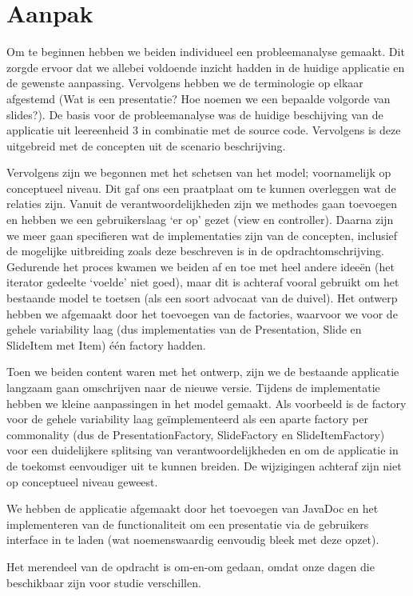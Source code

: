\documentclass[a4paper]{article}
\begin{document}
\section*{Aanpak}
Om te beginnen hebben we beiden individueel een probleemanalyse gemaakt. Dit zorgde ervoor dat we allebei voldoende inzicht hadden in de huidige applicatie en de gewenste aanpassing. Vervolgens hebben we de terminologie op elkaar afgestemd (Wat is een presentatie? Hoe noemen we een bepaalde volgorde van slides?). De basis voor de probleemanalyse was de huidige beschijving van de applicatie uit leereenheid 3 in combinatie met de source code. Vervolgens is deze uitgebreid met de concepten uit de scenario beschrijving.
\par
Vervolgens zijn we begonnen met het schetsen van het model; voornamelijk op conceptueel niveau. Dit gaf ons een praatplaat om te kunnen overleggen wat de relaties zijn. Vanuit de verantwoordelijkheden zijn we methodes gaan toevoegen en hebben we een gebruikerslaag `er op' gezet (view en controller). Daarna zijn we meer gaan specifieren wat de implementaties zijn van de concepten, inclusief de mogelijke uitbreiding zoals deze beschreven is in de opdrachtomschrijving. Gedurende het proces kwamen we beiden af en toe met heel andere ideeën (het iterator gedeelte `voelde' niet goed), maar dit is achteraf vooral gebruikt om het bestaande model te toetsen (als een soort advocaat van de duivel). Het ontwerp hebben we afgemaakt door het toevoegen van de factories, waarvoor we voor de gehele variability laag (dus implementaties van de Presentation, Slide en SlideItem met Item) één factory hadden. 
\par
Toen we beiden content waren met het ontwerp, zijn we de bestaande applicatie langzaam gaan omschrijven naar de nieuwe versie. Tijdens de implementatie hebben we kleine aanpassingen in het model gemaakt. Als voorbeeld is de factory voor de gehele variability laag geïmplementeerd als een aparte factory per commonality (dus de PresentationFactory, SlideFactory en SlideItemFactory) voor een duidelijkere splitsing van verantwoordelijkheden en om de applicatie in de toekomst eenvoudiger uit te kunnen breiden. De wijzigingen achteraf zijn niet op conceptueel niveau geweest.
\par
We hebben de applicatie afgemaakt door het toevoegen van JavaDoc en het implementeren van de functionaliteit om een presentatie via de gebruikers interface in te laden (wat noemenswaardig eenvoudig bleek met deze opzet).
\par
Het merendeel van de opdracht is om-en-om gedaan, omdat onze dagen die beschikbaar zijn voor studie verschillen.
\end{document}
